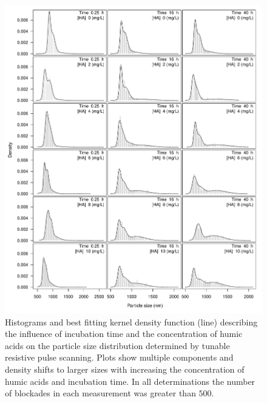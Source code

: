 \documentclass[journal=langd5,manuscript=article]{achemso}
\begin{document}
 \begin{figure}
  \includegraphics[width=\linewidth]{Figures/MCluster_MS_HA_density.pdf}
  \caption{Histograms and best fitting kernel density function (line) describing the influence of incubation time and the concentration of humic acids on the particle size distribution determined by tunable resistive pulse scanning. Plots show multiple components and density shifts to larger sizes with increasing the concentration of humic acids and incubation time. In all determinations the number of blockades in each measurement was greater than $500$.} 
  \label{fgr:multiplot_density}
\end{figure}
\end{document}
